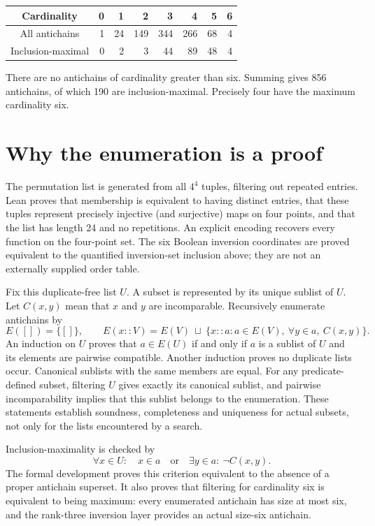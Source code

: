 \documentclass[11pt]{article}
\begin{document}
\begin{center}
\begin{tabular}{c*{7}{r}}
\toprule
Cardinality &0&1&2&3&4&5&6\\
\midrule
All antichains&1&24&149&344&266&68&4\\
Inclusion-maximal&0&2&3&44&89&48&4\\
\bottomrule
\end{tabular}
\end{center}
There are no antichains of cardinality greater than six. Summing gives 856 antichains, of which 190 are inclusion-maximal. Precisely four have the maximum cardinality six.

\section{Why the enumeration is a proof}
The permutation list is generated from all $4^4$ tuples, filtering out repeated entries. Lean proves that membership is equivalent to having distinct entries, that these tuples represent precisely injective (and surjective) maps on four points, and that the list has length 24 and no repetitions. An explicit encoding recovers every function on the four-point set. The six Boolean inversion coordinates are proved equivalent to the quantified inversion-set inclusion above; they are not an externally supplied order table.

Fix this duplicate-free list $U$. A subset is represented by its unique sublist of $U$. Let $C(x,y)$ mean that $x$ and $y$ are incomparable. Recursively enumerate antichains by
\[
 E([])=\{[]\},\qquad
 E(x::V)=E(V)\ \sqcup\ \{x::a:a\in E(V),\ \forall y\in a,\ C(x,y)\}.
\]
An induction on $U$ proves that $a\in E(U)$ if and only if $a$ is a sublist of $U$ and its elements are pairwise compatible. Another induction proves no duplicate lists occur. Canonical sublists with the same members are equal. For any predicate-defined subset, filtering $U$ gives exactly its canonical sublist, and pairwise incomparability implies that this sublist belongs to the enumeration. These statements establish soundness, completeness and uniqueness for actual subsets, not only for the lists encountered by a search.

Inclusion-maximality is checked by
\[
 \forall x\in U:\quad x\in a\quad\text{or}\quad
 \exists y\in a:\ \neg C(x,y).
\]
The formal development proves this criterion equivalent to the absence of a proper antichain superset. It also proves that filtering for cardinality six is equivalent to being maximum: every enumerated antichain has size at most six, and the rank-three inversion layer provides an actual size-six antichain.
\end{document}
